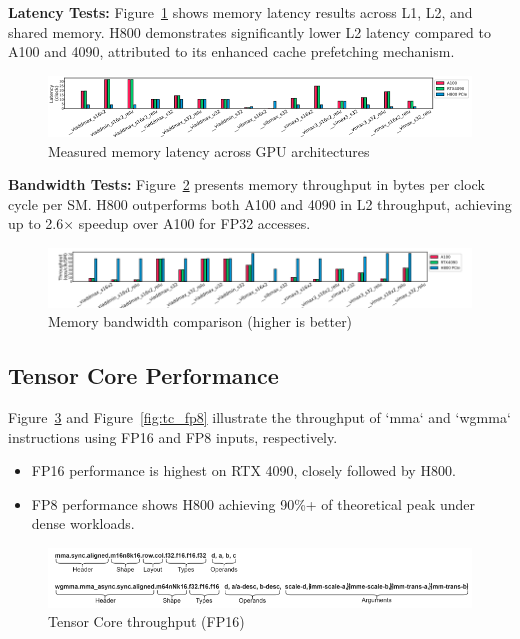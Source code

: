 \textbf{Latency Tests:}  
Figure~\ref{fig:latency_all} shows memory latency results across L1, L2, and shared memory. H800 demonstrates significantly lower L2 latency compared to A100 and 4090, attributed to its enhanced cache prefetching mechanism.

\begin{figure}[H]
\centering
\includegraphics[width=0.8\linewidth]{images/mem_latency.png}
\caption{Measured memory latency across GPU architectures}
\label{fig:latency_all}
\end{figure}

\textbf{Bandwidth Tests:}  
Figure~\ref{fig:bandwidth_all} presents memory throughput in bytes per clock cycle per SM. H800 outperforms both A100 and 4090 in L2 throughput, achieving up to 2.6× speedup over A100 for FP32 accesses.

\begin{figure}[H]
\centering
\includegraphics[width=0.8\linewidth]{images/mem_bandwidth.png}
\caption{Memory bandwidth comparison (higher is better)}
\label{fig:bandwidth_all}
\end{figure}

\subsection{Tensor Core Performance}

Figure~\ref{fig:tc_fp16} and Figure~\ref{fig:tc_fp8} illustrate the throughput of `mma` and `wgmma` instructions using FP16 and FP8 inputs, respectively.

\begin{itemize}
    \item FP16 performance is highest on RTX 4090, closely followed by H800.
    \item FP8 performance shows H800 achieving 90\%+ of theoretical peak under dense workloads.
\end{itemize}

\begin{figure}[H]
\centering
\includegraphics[width=0.75\linewidth]{images/tc_fp16.png}
\caption{Tensor Core throughput (FP16)}
\label{fig:tc_fp16}
\end{figure}

